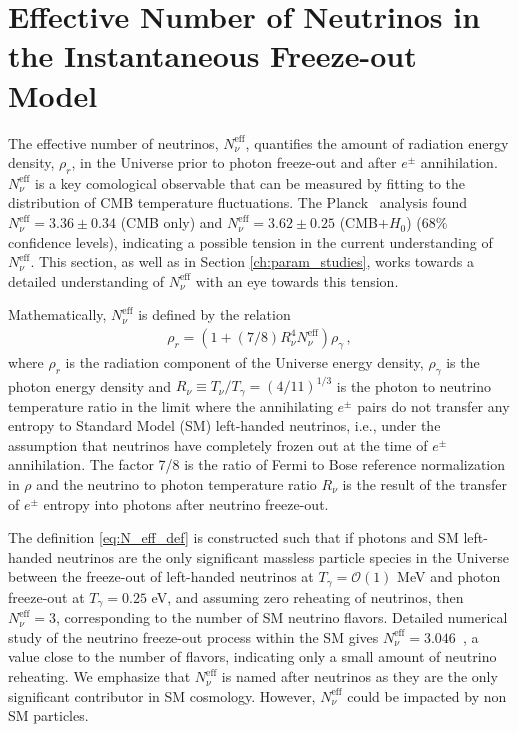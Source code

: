 \section{Effective Number of Neutrinos  in the Instantaneous  Freeze-out Model}\label{ch:model_ind}

The effective number of neutrinos, $N^{\text{eff}}_\nu$, quantifies the amount of radiation energy density, $\rho_r$, in the Universe prior to photon freeze-out and after $e^\pm$ annihilation.  $N^{\text{eff}}_\nu$ is a key comological observable that can be  measured by fitting to the distribution of CMB temperature fluctuations. The  Planck~\cite{Planck:2013pxb}  analysis found $N^{\text{eff}}_{\nu}=3.36\pm 0.34$ (CMB only) and $N^{\text{eff}}_{\nu}=3.62\pm 0.25$ (CMB+$H_0$) ($68\%$ confidence levels), indicating a possible tension in the current understanding of $N^{\text{eff}}_\nu$.   This section, as well as in Section \ref{ch:param_studies}, works towards a detailed understanding of $N^{\text{eff}}_{\nu}$ with an eye towards this tension.

Mathematically, $N^{\text{eff}}_\nu$ is defined by the relation
\begin{align}\label{eq:N_eff_def}
\rho_r=\left(1+(7/8)R_\nu^{4}N^{\text{eff}}_\nu\right)\rho_\gamma\,,
\end{align}
where $\rho_r$ is the radiation component of the Universe  energy density, $\rho_\gamma$ is the photon energy density and  $R_\nu\equiv T_\nu/T_\gamma=({4}/{11})^{1/3}$ is the photon to neutrino temperature ratio in the limit where  the annihilating $e^\pm$ pairs do not transfer any entropy  to  Standard Model (SM) left-handed neutrinos, i.e., under the assumption that neutrinos have completely frozen out at the time of $e^\pm$ annihilation.  The factor 7/8 is the ratio of Fermi to Bose reference normalization in $\rho$ and the neutrino to photon temperature ratio $R_\nu$ is the result of the transfer of $e^\pm$ entropy into photons after  neutrino freeze-out.  

The definition \ref{eq:N_eff_def} is constructed such that if photons and SM left-handed neutrinos are the only significant massless particle species in the Universe between the freeze-out of left-handed neutrinos at  $T_\gamma=\mathcal{O}(1)$ MeV and photon freeze-out at $T_\gamma=0.25$ eV, and assuming zero reheating of neutrinos, then $N^{\text{eff}}_{\nu}=3$, corresponding to the number of SM neutrino flavors.  Detailed numerical study of the neutrino freeze-out process within the SM gives $N^{\text{eff}}_{\nu}=3.046$~\cite{Mangano:2005cc}, a value close to the number of flavors, indicating only a small amount of neutrino reheating.  
 We emphasize that $N^{\text{eff}}_\nu$ is named after neutrinos as they are the only significant contributor in SM cosmology. However,   $N^{\text{eff}}_\nu$ could be impacted by non SM particles.

